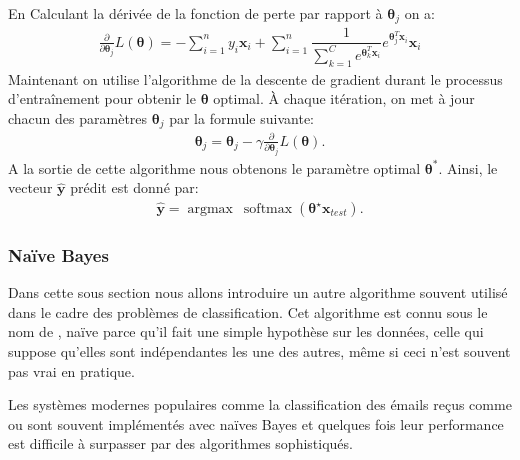 \documentclass[letterpaper,11pt,english]{sphinxmanual}
\begin{document}
\sphinxAtStartPar
En Calculant la dérivée de la fonction de perte par rapport à
\(\boldsymbol{\theta}_{j}\) on a:
\begin{equation}\label{equation:chapter3:chapter3:46}
\begin{split}\frac{\partial}{\partial \boldsymbol{\theta}_{j}}L(\boldsymbol{\theta})=-\sum_{i=1}^{n}y_{i}\mathbf{x}_i + \sum_{i=1}^{n}
\dfrac{1}{{\sum_{k=1}^{C}e^{\boldsymbol{\theta}_{k}^T \mathbf{x}_i}}}e^{\boldsymbol{\theta}_{j}^T\mathbf{x}_i}\mathbf{x}_i\end{split}
\end{equation}
\sphinxAtStartPar
Maintenant on utilise l’algorithme de la descente de gradient durant le
processus d’entraînement pour obtenir le \(\boldsymbol{\theta}\)
optimal. À chaque itération, on met à jour chacun des paramètres
\(\boldsymbol{\theta}_j\) par la formule suivante:
\begin{equation}\label{equation:chapter3:chapter3:47}
\begin{split}\boldsymbol{\theta}_{j} = \boldsymbol{\theta}_{j} - \gamma\frac{\partial}{\partial \boldsymbol{\theta}_{j}}L(\boldsymbol{\theta}).\end{split}
\end{equation}
\sphinxAtStartPar
A la sortie de cette algorithme nous obtenons le paramètre optimal
\(\boldsymbol{\theta}^{*}\). Ainsi, le vecteur
\(\mathbf{\hat{y}}\) prédit est donné par:
\begin{equation}\label{equation:chapter3:chapter3:48}
\begin{split}\mathbf{\hat{y}}= \operatorname{argmax }~\operatorname{softmax}(\boldsymbol{\theta}^{\star} \mathbf{x}_{test}).\end{split}
\end{equation}

\subsubsection{Naïve Bayes}
\label{\detokenize{chapter3:naive-bayes}}
\sphinxAtStartPar
Dans cette sous section nous allons introduire un autre algorithme
souvent utilisé dans le cadre des problèmes de classification. Cet
algorithme est connu sous le nom de , naïve parce qu’il
fait une simple hypothèse sur les données, celle qui suppose qu’elles
sont indépendantes les une des autres, même si ceci n’est souvent pas
vrai en pratique.

\sphinxAtStartPar
Les systèmes modernes populaires comme la classification des émails
reçus comme  ou  sont souvent implémentés avec
naïves Bayes et quelques fois leur performance est difficile à surpasser
par des algorithmes sophistiqués.
\end{document}
